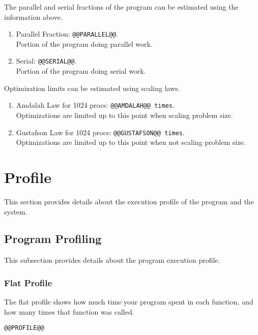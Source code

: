 \documentclass[a4paper]{article}
\begin{document}
The parallel and serial fractions of the program can be estimated using the information above.

\begin{enumerate}
\item Parallel Fraction: {\tt @@PARALLEL@@}.\\Portion of the program doing parallel work.
\item Serial: {\tt @@SERIAL@@}.\\Portion of the program doing serial work.
\end{enumerate}

Optimization limits can be estimated using scaling laws.

\begin{enumerate}
\item Amdalah Law for 1024 procs: {\tt @@AMDALAH@@ times}.\\ Optimizations are limited up to this point when scaling problem size. \cite{amdahl}
\item Gustafson Law for 1024 procs: {\tt @@GUSTAFSON@@ times}.\\ Optimizations are limited up to this point when not scaling problem size. \cite{gustafson}
\end{enumerate}

\section{Profile}

This section provides details about the execution profile of the program and the system.

\subsection{Program Profiling}

This subsection provides details about the program execution profile.


\subsubsection{Flat Profile}

The flat profile shows how much time your program spent in each function, and how many times that function was called.

\begin{verbatim}
@@PROFILE@@
\end{verbatim}
\end{document}
